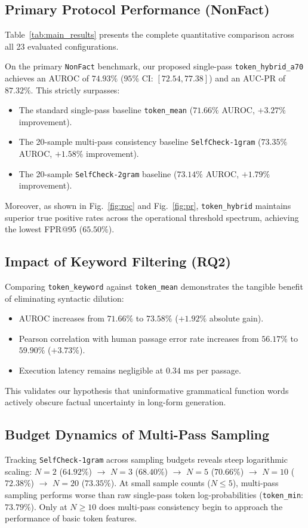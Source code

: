 \documentclass[conference]{IEEEtran}
\begin{document}
\subsection{Primary Protocol Performance (NonFact)}
Table~\ref{tab:main_results} presents the complete quantitative comparison across all 23 evaluated configurations. 

On the primary \texttt{NonFact} benchmark, our proposed single-pass \texttt{token\_hybrid\_a70} achieves an AUROC of $\mathbf{74.93\%}$ ($95\%\text{ CI: } [72.54, 77.38]$) and an AUC-PR of $\mathbf{87.32\%}$. This strictly surpasses:
\begin{itemize}
    \item The standard single-pass baseline \texttt{token\_mean} ($71.66\%$ AUROC, $+3.27\%$ improvement).
    \item The 20-sample multi-pass consistency baseline \texttt{SelfCheck-1gram} ($73.35\%$ AUROC, $+1.58\%$ improvement).
    \item The 20-sample \texttt{SelfCheck-2gram} baseline ($73.14\%$ AUROC, $+1.79\%$ improvement).
\end{itemize}
Moreover, as shown in Fig.~\ref{fig:roc} and Fig.~\ref{fig:pr}, \texttt{token\_hybrid} maintains superior true positive rates across the operational threshold spectrum, achieving the lowest FPR@95 ($65.50\%$).

\subsection{Impact of Keyword Filtering (RQ2)}
Comparing \texttt{token\_keyword} against \texttt{token\_mean} demonstrates the tangible benefit of eliminating syntactic dilution:
\begin{itemize}
    \item AUROC increases from $71.66\%$ to $73.58\%$ ($+1.92\%$ absolute gain).
    \item Pearson correlation with human passage error rate increases from $56.17\%$ to $59.90\%$ ($+3.73\%$).
    \item Execution latency remains negligible at $0.34\text{ ms}$ per passage.
\end{itemize}
This validates our hypothesis that uninformative grammatical function words actively obscure factual uncertainty in long-form generation.

\subsection{Budget Dynamics of Multi-Pass Sampling}
Tracking \texttt{SelfCheck-1gram} across sampling budgets reveals steep logarithmic scaling:
$N=2$ ($64.92\%$) $\rightarrow$ $N=3$ ($68.40\%$) $\rightarrow$ $N=5$ ($70.66\%$) $\rightarrow$ $N=10$ ($72.38\%$) $\rightarrow$ $N=20$ ($73.35\%$). At small sample counts ($N \le 5$), multi-pass sampling performs worse than raw single-pass token log-probabilities (\texttt{token\_min}: $73.79\%$). Only at $N \ge 10$ does multi-pass consistency begin to approach the performance of basic token features.
\end{document}
